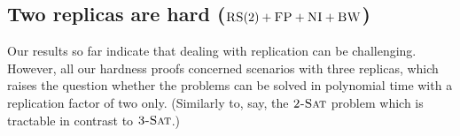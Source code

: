 \documentclass[9pt,twocolumn]{scrartcl}
\newcommand{\variab}{\nu}
\newcommand{\clauses}{\alpha}
\newcommand{\CC}{\textsc{NI}}
\newcommand{\FP}{\textsc{FP}}
\newcommand{\RS}{\textsc{RS}}
\newcommand{\BW}{\textsc{BW}}
\newcommand{\TSAT}{\textsc{3-Sat}}
\newcommand{\ZSAT}{\textsc{2-Sat}}
\newcommand{\Formula}{\ensuremath{\Psi}}
\newcommand{\Thr}{\ensuremath{Th}}
\newcommand{\positive}{\ensuremath{positive}}
\newcommand{\negative}{\ensuremath{negative}}
\newcommand{\Val}{\ensuremath{Val}}
\begin{document}
\begin{appendix}

\subsection{Two replicas are hard ($\RS(2)+\FP+\CC+\BW$)}\label{ssec:two}

Our results so far indicate that dealing with replication can be challenging.
However, all our hardness proofs concerned scenarios with three replicas,
which raises the question whether the problems can be solved in polynomial time
with a replication factor of two only. (Similarly to, say, the $\ZSAT$ problem
which is tractable in contrast to $\TSAT$.)


\end{appendix}
\end{document}
